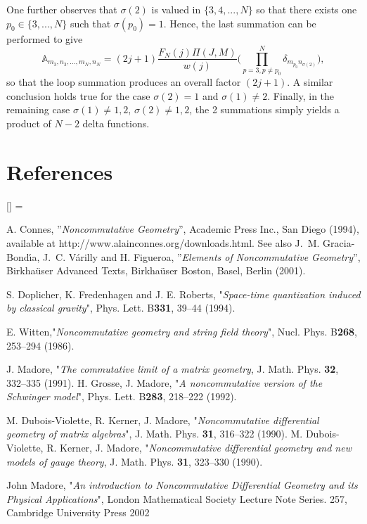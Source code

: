 \documentclass[a4paper,11pt,twoside]{article}
\numberwithin{equation}{section}
\theoremstyle{nonumberplain}
\newcounter{and}
\renewenvironment{thebibliography}[1]{%
\section*{References}%
\frenchspacing\small%
\begin{list}{[\arabic{enumi}]}%
{%
\usecounter{enumi}\parsep=2pt\topsep 0pt%
\settowidth{\labelwidth}{[#1]}%
\leftmargin=\labelwidth\advance\leftmargin\labelsep%
\rightmargin=0pt\itemsep=1pt\sloppy%
}%
}{\end{list}}
\begin{document}
One further observes that $\sigma(2)$ is valued in $\{3,4,...,N \}$ so that there exists one $p_0\in\{3,...,N \}$ such that $\sigma(p_0)=1$. Hence, the last summation can be performed to give
\begin{equation}
\mathbb{A}_{m_3,n_3,...,m_N,n_N}=(2j+1)\frac{F_N(j)\Pi(J,M)}{w(j)}\big(\prod_{p=3, p\ne p_0}^N \delta_{m_{p_0}n_{\sigma(2)}}\big)\label{C-7},
\end{equation}
so that the loop summation produces an overall factor $(2j+1)$. A similar conclusion holds true for the case $\sigma(2)=1$ and $\sigma(1)\ne2$. Finally, in the remaining case $\sigma(1)\ne1,2$, $\sigma(2)\ne1,2$, the 2 summations simply yields a product of $N-2$ delta functions.



\begin{thebibliography}{88}
 
 A. Connes, ''{\it{Noncommutative Geometry}}'', Academic Press Inc., San Diego (1994), available at http://www.alainconnes.org/downloads.html. See also J.~M. Gracia-Bond{\'\i}a, J.~C. V{\'a}rilly and H. Figueroa, ''{\it{Elements of Noncommutative Geometry}}'', Birkha\"user Advanced Texts, Birkha\"user Boston, Basel, Berlin (2001).

%
S. Doplicher, K. Fredenhagen and J. E. Roberts, "{\it{Space-time quantization induced by classical gravity}}", {Phys. Lett. B\textbf{331}, 39--44 (1994)}.%

%
E. Witten,"{\it{Noncommutative geometry and string field theory}}", 
{Nucl. Phys. B\textbf{268}, 253--294 (1986)}.

J. Madore, "{\it{The commutative limit of a matrix geometry}}, {J. Math. Phys. \textbf{32}, 332--335 (1991)}. H. Grosse, J. Madore, "{\it{A noncommutative version of the Schwinger model}}", {Phys. Lett. B\textbf{283}, 218--222 (1992)}.%

M. Dubois-Violette, R. Kerner, J. Madore, "{\it{Noncommutative differential geometry of matrix algebras}}", %
{J. Math. Phys. \textbf{31}, 316--322 (1990)}. M. Dubois-Violette, R. Kerner, J. Madore, "{\it{Noncommutative differential geometry and new models of gauge theory}}, {J. Math. Phys. \textbf{31}, 323--330 (1990)}.

 John Madore, "{\it{An introduction to Noncommutative Differential Geometry and its Physical Applications}}", London Mathematical Society Lecture Note Series. 257, Cambridge University Press 2002


\end{thebibliography}
\end{document}

